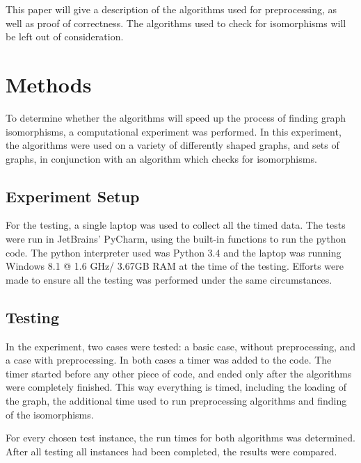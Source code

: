 \documentclass[twoside]{article}
\theoremstyle{definition}
\theoremstyle{plain}
\begin{document}
\begin{multicols}{2}
This paper will give a description of the algorithms used for preprocessing, as well as proof of correctness. The algorithms used to check for isomorphisms will be left out of consideration.

\section{Methods}
To determine whether the algorithms will speed up the process of finding graph isomorphisms, a computational experiment was performed. In this experiment, the algorithms were used on a variety of differently shaped graphs, and sets of graphs, in conjunction with an algorithm which checks for isomorphisms.

\subsection{Experiment Setup}
For the testing, a single laptop was used to collect all the timed data. The tests were run in JetBrains' PyCharm, using the built-in functions to run the python code. The python interpreter used was Python 3.4 and the laptop was running Windows 8.1 @ 1.6 GHz/ 3.67GB RAM at the time of the testing. Efforts were made to ensure all the testing was performed under the same circumstances.

\subsection{Testing}
In the experiment, two cases were tested: a basic case, without preprocessing, and a case with preprocessing. In both cases a timer was added to the code. The timer started before any other piece of code, and ended only after the algorithms were completely finished. This way everything is timed, including the loading of the graph, the additional time used to run preprocessing algorithms and finding of the isomorphisms.

For every chosen test instance, the run times for both algorithms was determined. After all testing all instances had been completed, the results were compared.


\end{multicols}
\end{document}
